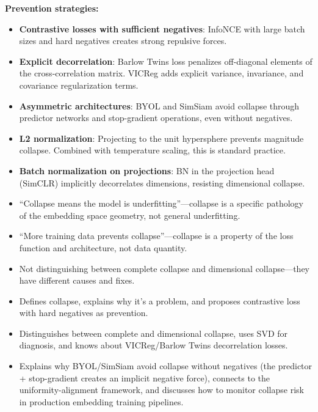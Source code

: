 \begin{interviewq}
\textbf{Prevention strategies:}
\begin{itemize}
    \item \textbf{Contrastive losses with sufficient negatives}: InfoNCE with large batch sizes and hard negatives creates strong repulsive forces.
    \item \textbf{Explicit decorrelation}: Barlow Twins loss penalizes off-diagonal elements of the cross-correlation matrix. VICReg adds explicit variance, invariance, and covariance regularization terms.
    \item \textbf{Asymmetric architectures}: BYOL and SimSiam avoid collapse through predictor networks and stop-gradient operations, even without negatives.
    \item \textbf{L2 normalization}: Projecting to the unit hypersphere prevents magnitude collapse. Combined with temperature scaling, this is standard practice.
    \item \textbf{Batch normalization on projections}: BN in the projection head (SimCLR) implicitly decorrelates dimensions, resisting dimensional collapse.
\end{itemize}

\redflags
\begin{itemize}
    \item ``Collapse means the model is underfitting''---collapse is a specific pathology of the embedding space geometry, not general underfitting.
    \item ``More training data prevents collapse''---collapse is a property of the loss function and architecture, not data quantity.
    \item Not distinguishing between complete collapse and dimensional collapse---they have different causes and fixes.
\end{itemize}


\goodgreat
\begin{itemize}
    \item {} Defines collapse, explains why it's a problem, and proposes contrastive loss with hard negatives as prevention.
    \item {} Distinguishes between complete and dimensional collapse, uses SVD for diagnosis, and knows about VICReg/Barlow Twins decorrelation losses.
    \item {} Explains why BYOL/SimSiam avoid collapse without negatives (the predictor + stop-gradient creates an implicit negative force), connects to the uniformity-alignment framework, and discusses how to monitor collapse risk in production embedding training pipelines.
\end{itemize}

\end{interviewq}

